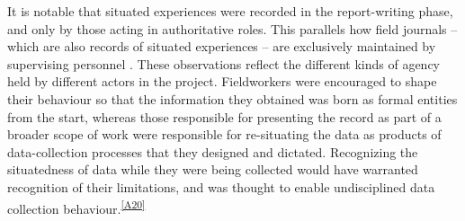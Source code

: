 It is notable that situated experiences were recorded in the report-writing phase, and only by those acting in authoritative roles.
This parallels how field journals -- which are also records of situated experiences -- are exclusively maintained by supervising personnel \parencite[]{batist2024a}.
These observations reflect the different kinds of agency held by different actors in the project.
Fieldworkers were encouraged to shape their behaviour so that the information they obtained was born as formal entities from the start, whereas those responsible for presenting the record as part of a broader scope of work were responsible for re-situating the data as products of data-collection processes that they designed and dictated.
Recognizing the situatedness of data while they were being collected would have warranted recognition of their limitations, and was thought to enable undisciplined data collection behaviour.\textsuperscript{\ref{A20}}




